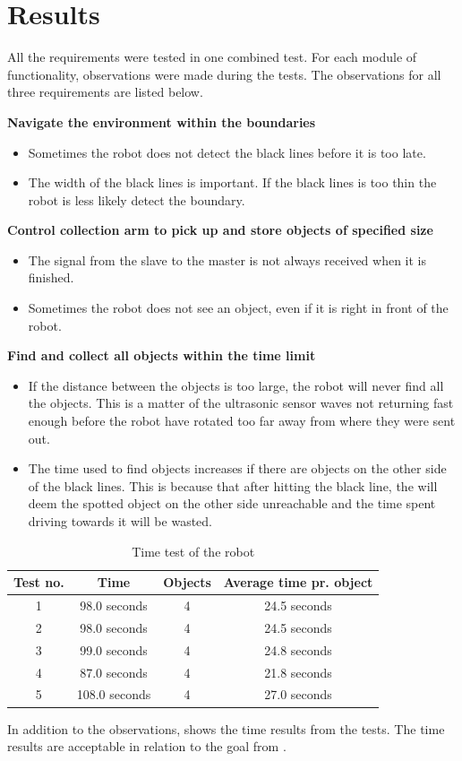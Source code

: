 \section{Results}

All the requirements were tested in one combined test. For each module of functionality, observations were made during the tests. The observations for all three requirements are listed below.

\textbf{Navigate the environment within the boundaries}
\begin{itemize}
\item Sometimes the robot does not detect the black lines before it is too late.
\item The width of the black lines is important. If the black lines is too thin the robot is less likely detect the boundary.
\end{itemize}

\textbf{Control collection arm to pick up and store objects of specified size}
\begin{itemize}
\item The signal from the slave to the master is not always received when it is finished.
\item Sometimes the robot does not see an object, even if it is right in front of the robot.
\end{itemize}

\textbf{Find and collect all objects within the time limit}
\begin{itemize}
\item If the distance between the objects is too large, the robot will never find all the objects. This is a matter of the ultrasonic sensor waves not returning fast enough before the robot have rotated too far away from where they were sent out.
\item The time used to find objects increases if there are objects on the other side of the black lines. This is because that after hitting the black line, the \projname{} will deem the spotted object on the other side unreachable and the time spent driving towards it will be wasted.
\end{itemize}

\begin{table}[H]
	\centering
   \begin{tabular}{|c|c|c|c|}
   \hline  
   Test no. & Time & Objects & Average time pr. object \\ \hline
      1    & 98.0 seconds    & 4 & 24.5 seconds   \\ \hline
      2    & 98.0 seconds    & 4 & 24.5 seconds  \\ \hline
      3    & 99.0 seconds    & 4 & 24.8 seconds  \\ \hline
      4    & 87.0 seconds    & 4 & 21.8 seconds  \\ \hline
      5    & 108.0 seconds   & 4 & 27.0 seconds  \\ \hline
   \end{tabular}
   \caption{\label{table:FinalTimeTestRobot} Time test of the robot}
\end{table}

In addition to the observations,  shows the time results from the tests. The time results are acceptable in relation to the goal from .









